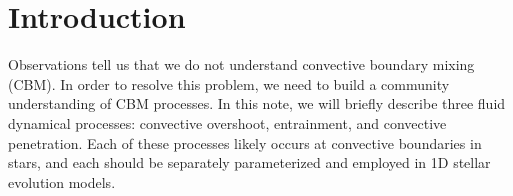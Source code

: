 \section{Introduction}
\label{sec:introduction}
Observations tell us that we do not understand convective boundary mixing (CBM).
In order to resolve this problem, we need to build a community understanding of CBM processes.
In this note, we will briefly describe three fluid dynamical processes: convective overshoot, entrainment, and convective penetration.
Each of these processes likely occurs at convective boundaries in stars, and each should be separately parameterized and employed in 1D stellar evolution models.
